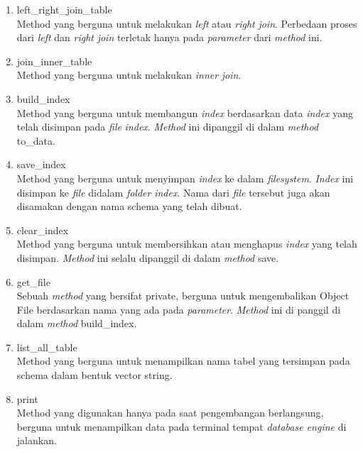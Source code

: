 \begin{enumerate}
	\item left\_right\_join\_table \\
	Method yang berguna untuk melakukan \emph{left} atau \emph{right} \emph{join}. Perbedaan proses dari \emph{left} dan \emph{right} \emph{join} terletak hanya pada \emph{parameter} dari \emph{method} ini.
  
	\item join\_inner\_table \\
	Method yang berguna untuk melakukan \emph{inner} \emph{join}.
  
	\item build\_index \\
	Method yang berguna untuk membangun \emph{index} berdasarkan data \emph{index} yang telah disimpan pada \emph{file} \emph{index}. \emph{Method} ini dipanggil di dalam \emph{method} to\_data.

	\item save\_index \\
	Method yang berguna untuk menyimpan \emph{index} ke dalam \emph{filesystem}. \emph{Index} ini disimpan ke \emph{file} didalam \emph{folder} \emph{index}. Nama dari \emph{file} tersebut juga akan
  disamakan dengan nama schema yang telah dibuat.

	\item clear\_index \\
	Method yang berguna untuk membersihkan  atau menghapus \emph{index} yang telah disimpan. \emph{Method} ini selalu dipanggil di dalam \emph{method} save.
  
	\item get\_file \\
	Sebuah \emph{method} yang bersifat private, berguna untuk mengembalikan Object File berdasarkan nama yang ada pada \emph{parameter}. 
  \emph{Method} ini di panggil di dalam \emph{method} build\_index.

	\item list\_all\_table \\
	Method yang berguna untuk menampilkan nama tabel yang tersimpan pada schema dalam bentuk vector string.

	\item print \\
	Method yang digunakan hanya pada saat pengembangan berlangsung, berguna untuk menampilkan data pada terminal tempat \emph{database engine} di jalankan.
\end{enumerate}

